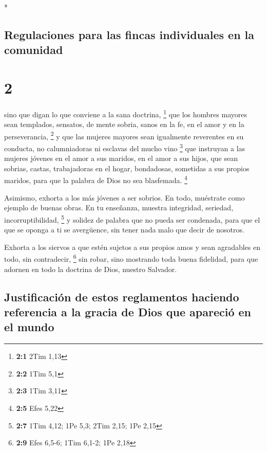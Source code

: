 \begin{paracol}{2}
\begin{otherlanguage}{english}
\end{otherlanguage}

\switchcolumn[0]*

\hypertarget{regulaciones-para-las-fincas-individuales-en-la-comunidad}{%
\subsection{Regulaciones para las fincas individuales en la
comunidad}\label{regulaciones-para-las-fincas-individuales-en-la-comunidad}}

\hypertarget{section-2}{%
\section{2}\label{section-2}}

 sino que digan lo que conviene a la sana doctrina,
\footnote{\textbf{2:1} 2Tim 1,13}  que los hombres mayores
sean templados, sensatos, de mente sobria, sanos en la fe, en el amor y
en la perseverancia, \footnote{\textbf{2:2} 1Tim 5,1}  y
que las mujeres mayores sean igualmente reverentes en su conducta, no
calumniadoras ni esclavas del mucho vino \footnote{\textbf{2:3} 1Tim
  3,11}  que instruyan a las mujeres jóvenes en el amor a
sus maridos, en el amor a sus hijos,  que sean sobrias,
castas, trabajadoras en el hogar, bondadosas, sometidas a sus propios
maridos, para que la palabra de Dios no sea blasfemada. \footnote{\textbf{2:5}
  Efes 5,22}

 Asimismo, exhorta a los más jóvenes a ser sobrios.
 En todo, muéstrate como ejemplo de buenas obras. En tu
enseñanza, muestra integridad, seriedad, incorruptibilidad, \footnote{\textbf{2:7}
  1Tim 4,12; 1Pe 5,3; 2Tim 2,15; 1Pe 2,15}  y solidez de
palabra que no pueda ser condenada, para que el que se oponga a ti se
avergüence, sin tener nada malo que decir de nosotros.

 Exhorta a los siervos a que estén sujetos a sus propios
amos y sean agradables en todo, sin contradecir, \footnote{\textbf{2:9}
  Efes 6,5-6; 1Tim 6,1-2; 1Pe 2,18}  sin robar, sino
mostrando toda buena fidelidad, para que adornen en todo la doctrina de
Dios, nuestro Salvador.

\hypertarget{justificaciuxf3n-de-estos-reglamentos-haciendo-referencia-a-la-gracia-de-dios-que-apareciuxf3-en-el-mundo}{%
\subsection{Justificación de estos reglamentos haciendo referencia a la
gracia de Dios que apareció en el
mundo}\label{justificaciuxf3n-de-estos-reglamentos-haciendo-referencia-a-la-gracia-de-dios-que-apareciuxf3-en-el-mundo}}


\end{paracol}
